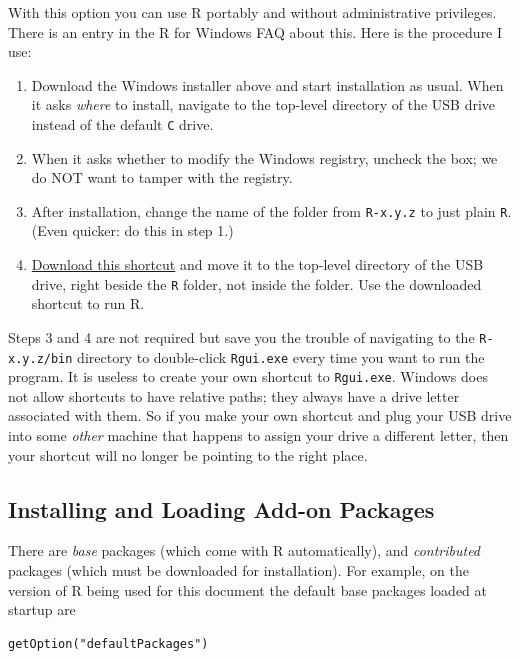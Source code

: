 \documentclass[captions=tableheading]{scrbook}
\begin{document}
With this option you can use \textsf{R} portably and without administrative privileges. There is an entry in the \textsf{R} for Windows FAQ about this. Here is the procedure I use:  
\begin{enumerate}
\item Download the Windows installer above and start installation as usual. When it asks \emph{where} to install, navigate to the top-level directory of the USB drive instead of the default \texttt{C} drive.
\item When it asks whether to modify the Windows registry, uncheck the box; we do NOT want to tamper with the registry.
\item After installation, change the name of the folder from \texttt{R-x.y.z} to just plain \texttt{R}. (Even quicker: do this in step 1.)
\item \href{http://ipsur.r-forge.r-project.org/book/download/R.exe}{Download this shortcut} and move it to the top-level directory of the USB drive, right beside the \texttt{R} folder, not inside the folder. Use the downloaded shortcut to run \textsf{R}.
\end{enumerate}

Steps 3 and 4 are not required but save you the trouble of navigating to the \texttt{R-x.y.z/bin} directory to double-click \texttt{Rgui.exe} every time you want to run the program. It is useless to create your own shortcut to \texttt{Rgui.exe}. Windows does not allow shortcuts to have relative paths; they always have a drive letter associated with them. So if you make your own shortcut and plug your USB drive into some \emph{other} machine that happens to assign your drive a different letter, then your shortcut will no longer be pointing to the right place. 
\subsection{Installing and Loading Add-on Packages}
\label{sec-2-1-2}

\label{sub:installing-loading-packages}

There are \emph{base} packages (which come with \textsf{R} automatically), and \emph{contributed} packages (which must be downloaded for installation). For example, on the version of \textsf{R} being used for this document the default base packages loaded at startup are 


\begin{verbatim}
getOption("defaultPackages")
\end{verbatim}
\end{document}

